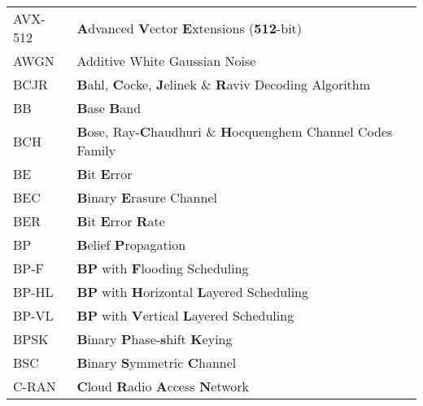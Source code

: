 \begin{center}
\begin{longtable}{ p{}  p{} }
AVX-512     & \textbf{A}dvanced \textbf{V}ector \textbf{E}xtensions (\textbf{512}-bit)                                        \\
AWGN        & Additive White Gaussian Noise                                                                                   \\
BCJR        & \textbf{B}ahl, \textbf{C}ocke, \textbf{J}elinek \& \textbf{R}aviv Decoding Algorithm                            \\
BB          & \textbf{B}ase \textbf{B}and                                                                                     \\
BCH         & \textbf{B}ose, Ray-\textbf{C}haudhuri \& \textbf{H}ocquenghem Channel Codes Family                              \\
BE          & \textbf{B}it \textbf{E}rror                                                                                     \\
BEC         & \textbf{B}inary \textbf{E}rasure Channel                                                                        \\
BER         & \textbf{B}it \textbf{E}rror \textbf{R}ate                                                                       \\
BP          & \textbf{B}elief \textbf{P}ropagation                                                                            \\
BP-F        & \textbf{BP} with \textbf{F}looding Scheduling                                                                   \\
BP-HL       & \textbf{BP} with \textbf{H}orizontal \textbf{L}ayered Scheduling                                                \\
BP-VL       & \textbf{BP} with \textbf{V}ertical \textbf{L}ayered Scheduling                                                  \\
BPSK        & \textbf{B}inary \textbf{P}hase-\textbf{s}hift \textbf{K}eying                                                   \\
BSC         & \textbf{B}inary \textbf{S}ymmetric \textbf{C}hannel                                                             \\
C-RAN       & \textbf{C}loud \textbf{R}adio \textbf{A}ccess \textbf{N}etwork                                                  \\

\end{longtable}
\end{center}
